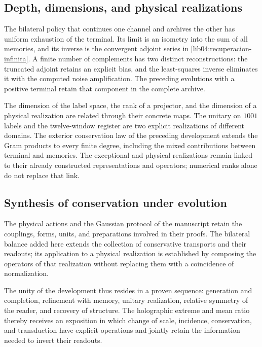 \subsection{Depth, dimensions, and physical realizations}
\label{lib06:profundidad}

The bilateral policy that continues one channel and archives the other
has uniform exhaustion of the terminal. Its limit is an
isometry into the sum of all memories, and its inverse is
the convergent adjoint series in
\eqref{lib04:recuperacion-infinita}. A finite number of
complements has two distinct reconstructions: the
truncated adjoint retains an explicit bias, and the least-squares
inverse eliminates it with the computed noise
amplification. The preceding evolutions with a positive terminal
retain that component in the complete archive.

The dimension of the label space, the rank of a projector, and
the dimension of a physical realization are related through
their concrete maps. The unitary on \(1001\) labels and the
twelve-window register are two explicit realizations of
different domains. The exterior conservation law of the preceding
development extends the Gram products to every finite degree,
including the mixed contributions between terminal and memories.
The exceptional and physical realizations remain linked
to their already constructed representations and operators; numerical
ranks alone do not replace that link.

\subsection{Synthesis of conservation under evolution}
The physical actions and the Gaussian protocol of the manuscript
retain the couplings, forms, units, and
preparations involved in their proofs. The bilateral
balance added here extends the collection of conservative
transports and their readouts; its application to a physical
realization is established by composing the operators of that
realization without replacing them with a coincidence of
normalization.

The unity of the development thus resides in a proven
sequence: generation and completion, refinement with memory,
unitary realization, relative symmetry of the reader, and recovery
of structure. The holographic extreme and mean ratio thereby
receives an exposition in which change of scale, incidence,
conservation, and transduction have explicit operations and
jointly retain the information needed to invert
their readouts.
